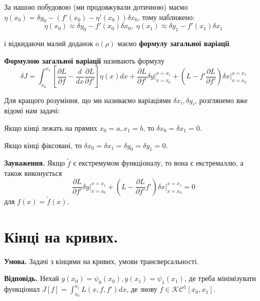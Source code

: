 \documentclass[14pt]{extarticle}
\newcommand{\<}{\langle}
\renewcommand{\>}{\rangle}
\theoremstyle{mystyle}{\newtheorem{definition}{Definition}[section]}
\theoremstyle{mystyle}{\newtheorem{proposition}[definition]{Proposition}}
\theoremstyle{mystyle}{\newtheorem{theorem}[definition]{Theorem}}
\theoremstyle{mystyle}{\newtheorem{lemma}[definition]{Lemma}}
\theoremstyle{mystyle}{\newtheorem{corollary}[definition]{Corollary}}
\theoremstyle{mystyle}{\newtheorem*{remark}{Remark}}
\theoremstyle{mystyle}{\newtheorem*{remarks}{Remarks}}
\theoremstyle{mystyle}{\newtheorem*{example}{Example}}
\theoremstyle{mystyle}{\newtheorem*{examples}{Examples}}
\theoremstyle{definition}{\newtheorem*{exercise}{Exercise}}
\theoremstyle{cstyle}{\newtheorem*{cthm}{}}
\theoremstyle{warn}
\begin{document}
За нашою побудовою (ми продовжували дотичною) маємо $\eta(x_0) = \delta y_0 - (f'(x_0)-\eta'(x_0))\delta x_0$, тому наближено:
\begin{equation}
    \eta(x_0) \approx \delta y_0 - f'(x_0)\delta x_0, \; \eta(x_1) \approx \delta y_1 - f'(x_1)\delta x_1
\end{equation}

і відкидаючи малий доданок $\overline{o}(\rho)$ маємо \textbf{формулу загальної варіації}.
\begin{definition}
\textbf{Формулою загальної варіації} називають формулу
\begin{equation}
    \delta J = \int_{x_0}^{x_1}\left[\frac{\partial L}{\partial f}-\frac{d}{dx}\frac{\partial L}{\partial f'}\right]\eta(x)dx + \frac{\partial L}{\partial f'}\delta y\Big|_{x=x_0}^{x=x_1} +
    \left(L-f'\frac{\partial L}{\partial f'}\right)\delta x \Big|_{x=x_0}^{x=x_1}
\end{equation}
\end{definition}

Для кращого розуміння, що ми називаємо варіаціями $\delta x_i,\delta y_i$,
розглянемо вже відомі нам задачі:

\begin{example}
    Якщо кінці лежать на прямих $x_0=a,x_1=b$, то $\delta x_0=\delta x_1=0$.
\end{example}
\begin{example}
    Якщо кінці фіксовані, то $\delta x_0=\delta x_1 = \delta y_0 = \delta y_1 = 0$.
\end{example}

\textbf{Зауваження.} Якщо $\widetilde{f}$ є екстремумом функціоналу, то вона є екстремаллю, а також виконується
\begin{equation}
    \frac{\partial L}{\partial f'}\delta y \Big|_{x=x_0}^{x=x_1} + \left(L-\frac{\partial L}{\partial f'}f'\right)\delta x \Big|_{x=x_0}^{x=x_1} = 0
\end{equation}
для $f(x)=\widetilde{f}(x)$.

\pagebreak

\section{Кінці на кривих.}

\textbf{Умова.} Задачі з кінцями на кривих, умови трансверсальності.

\textbf{Відповідь.} Нехай $y(x_0)=\psi_0(x_0), y(x_1)=\psi_1(x_1)$, де треба мінімізувати функціонал $J[f]=\int_{x_0}^{x_1}L(x,f,f')dx$, де знову $f \in \mathcal{KC}^1[x_0,x_1]$.
\end{document}
